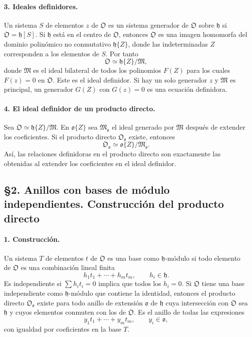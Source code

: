 \documentclass[11pt]{article}
\begin{document}
\paragraph{3. Ideales definidores.}
Un sistema $S$ de elementos $z$ de $\mathfrak O$ es un sistema generador de $\mathfrak O$ sobre $\mathfrak h$ si $\mathfrak O=\mathfrak h[S]$. Si $\mathfrak h$ está en el centro de $\mathfrak O$, entonces $\mathfrak O$ es una imagen homomorfa del dominio polinómico no conmutativo $\mathfrak h\{Z\}$, donde las indeterminadas $Z$ corresponden a los elementos de $S$. Por tanto
\[
        \mathfrak O\simeq \mathfrak h\{Z\}/\mathfrak M,
\]
donde $\mathfrak M$ es el ideal bilateral de todos los polinomios $F(Z)$ para los cuales $F(z)=0$ en $\mathfrak O$. Este es el ideal definidor. Si hay un solo generador $z$ y $\mathfrak M$ es principal, un generador $G(Z)$ con $G(z)=0$ es una ecuación definidora.

\paragraph{4. El ideal definidor de un producto directo.}
Sea $\mathfrak O\simeq\mathfrak h\{Z\}/\mathfrak M$. En $\mathfrak o\{Z\}$ sea $\mathfrak M_{\mathfrak o}$ el ideal generado por $\mathfrak M$ después de extender los coeficientes. Si el producto directo $\mathfrak O_{\mathfrak o}$ existe, entonces
\[
        \mathfrak O_{\mathfrak o}\simeq \mathfrak o\{Z\}/\mathfrak M_{\mathfrak o}.
\]
Así, las relaciones definidoras en el producto directo son exactamente las obtenidas al extender los coeficientes en el ideal definidor.

\subsection*{§2. Anillos con bases de módulo independientes. Construcción del producto directo}

\paragraph{1. Construcción.}
Un sistema $T$ de elementos $t$ de $\mathfrak O$ es una base como $\mathfrak h$-módulo si todo elemento de $\mathfrak O$ es una combinación lineal finita
\[
        h_1t_1+\cdots+h_mt_m,
        \qquad h_i\in\mathfrak h.
\]
Es independiente si $\sum h_it_i=0$ implica que todos los $h_i=0$. Si $\mathfrak O$ tiene una base independiente como $\mathfrak h$-módulo que contiene la identidad, entonces el producto directo $\mathfrak O_{\mathfrak o}$ existe para todo anillo de extensión $\mathfrak o$ de $\mathfrak h$ cuya intersección con $\mathfrak O$ sea $\mathfrak h$ y cuyos elementos conmuten con los de $\mathfrak O$. Es el anillo de todas las expresiones
\[
        y_1t_1+\cdots+y_mt_m,
        \qquad y_i\in\mathfrak o,
\]
con igualdad por coeficientes en la base $T$.
\end{document}
